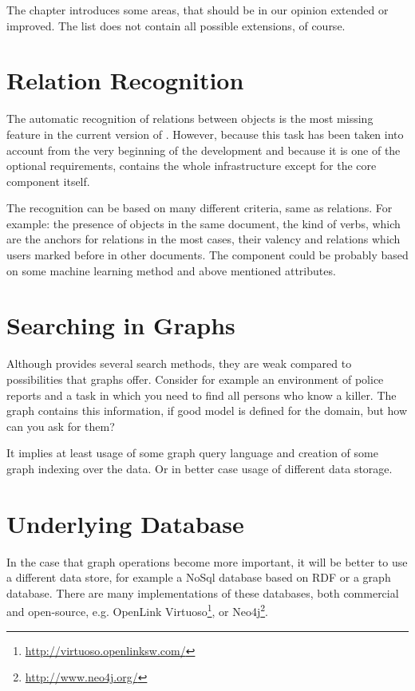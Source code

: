 
The chapter introduces some areas, that should be in our opinion extended or
improved. The list does not contain all possible extensions, of course.

\section{Relation Recognition}
The automatic recognition of relations between objects is the most missing
feature in the current version of \textan{}. However, because this task has been
taken into account from the very beginning of the development and because it is
one of the optional requirements, \textan{} contains the whole infrastructure
except for the core component itself.

The recognition can be based on many different criteria, same as relations.
For example: the presence of objects in the same document, the kind of verbs,
which are the anchors for relations in the most cases, their valency and
relations which users marked before in other documents. The component could be
probably based on some machine learning method and above mentioned attributes.

\section{Searching in Graphs}
Although \textan{} provides several search methods, they are weak compared to
possibilities that graphs offer. Consider for example an environment of police
reports and a task in which you need to find all persons who know a killer. The
graph contains this information, if good model is defined for the domain, but
how can you ask for them?

It implies at least usage of some graph query language and creation of some
graph indexing over the data. Or in better case usage of different data storage. 

\section{Underlying Database}
In the case that graph operations become more important, it will be better to
use a different data store, for example a NoSql database based on RDF or a graph
database. There are many implementations of these databases, both commercial and
open-source, e.g. OpenLink Virtuoso\footnote{\url{http://virtuoso.openlinksw.com/}},
or Neo4j\footnote{\url{http://www.neo4j.org/}}.

